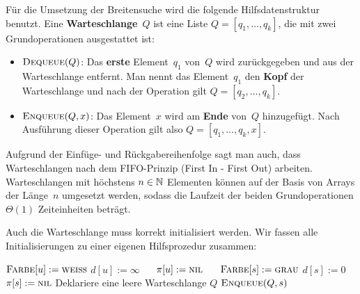 \begin{defn} 
Für die Umsetzung der Breitensuche wird die folgende Hilfsdatenstruktur benutzt.
Eine \textbf{Warteschlange}~$Q$ ist eine Liste $Q=[q_1,\ldots,q_k]$, die mit zwei Grundoperationen ausgestattet ist:
\begin{itemize}
 \item $\mathop{\text{\textsc{Dequeue}}}(Q)$: Das \textbf{erste} Element~$q_1$ von~$Q$ wird zurückgegeben und aus der Warteschlange entfernt.
 Man nennt das Element~$q_1$ den \textbf{Kopf} der Warteschlange und nach der Operation gilt $Q=[q_2,\ldots,q_k]$.

 \item $\mathop{\text{\textsc{Enqueue}}}(Q,x)$: Das Element~$x$ wird am \textbf{Ende} von~$Q$ hinzugefügt.
 Nach Ausführung dieser Operation gilt also $Q=[q_1,\ldots,q_k,x]$. 
\end{itemize}
\end{defn} 

\begin{bem}
Aufgrund der Einfüge- und Rückgabereihenfolge sagt man auch, dass Warteschlangen nach dem FIFO-Prinzip (First In - First Out) arbeiten.
Warteschlangen mit höchstens $n \in \mathbb{N}$ Elementen können auf der Basis von Arrays der Länge~$n$ umgesetzt werden, sodass die Laufzeit der beiden Grundoperationen $\Theta(1)$ Zeiteinheiten beträgt. 
\end{bem} 



\begin{bem} 
Auch die Warteschlange muss korrekt initialisiert werden.
Wir fassen alle Initialisierungen zu einer eigenen Hilfsprozedur zusammen:

\begin{algorithm}[H]
\caption{$\cc{Breitensuche-initialisieren}(s)$}
\begin{algorithmic}[1]
  \STATE $\mathop{\text{\textsc{Farbe}}}[u] := \mathop{\text{\textsc{weiss}}}$
  \STATE $d[u] := \infty$ $\quad$ 
  \STATE $\pi[u] := \mathop{\text{\textsc{nil}}}$ $\quad$ 
 \ENDFOR
 \STATE $\mathop{\text{\textsc{Farbe}}}[s] := \mathop{\text{\textsc{grau}}}$
 \STATE $d[s] := 0$
 \STATE $\pi[s] := \mathop{\text{\textsc{nil}}}$
 \STATE Deklariere eine leere Warteschlange $Q$
 \STATE $\mathop{\text{\textsc{Enqueue}}}(Q,s)$
\end{algorithmic}
\end{algorithm}
\end{bem}


